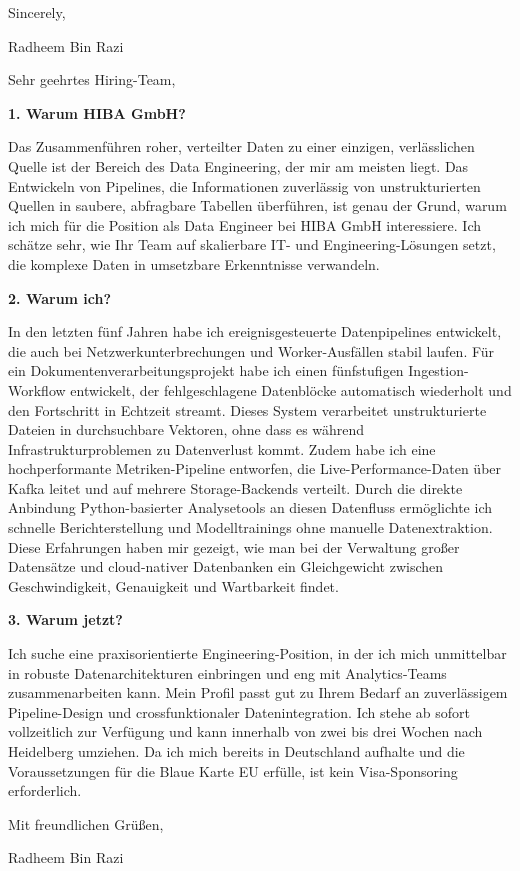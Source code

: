 \documentclass[11pt,a4paper]{coverletter}
\begin{document}
\closing{Sincerely,}{Radheem Bin Razi}

\clearpage
{}


\opening{Sehr geehrtes Hiring-Team,}

\vspace{8pt}\noindent\textbf{1. Warum HIBA GmbH?}\par\vspace{3pt}

Das Zusammenführen roher, verteilter Daten zu einer einzigen, verlässlichen Quelle ist der Bereich des Data Engineering, der mir am meisten liegt. Das Entwickeln von Pipelines, die Informationen zuverlässig von unstrukturierten Quellen in saubere, abfragbare Tabellen überführen, ist genau der Grund, warum ich mich für die Position als Data Engineer bei HIBA GmbH interessiere. Ich schätze sehr, wie Ihr Team auf skalierbare IT- und Engineering-Lösungen setzt, die komplexe Daten in umsetzbare Erkenntnisse verwandeln.

\vspace{8pt}\noindent\textbf{2. Warum ich?}\par\vspace{3pt}

In den letzten fünf Jahren habe ich ereignisgesteuerte Datenpipelines entwickelt, die auch bei Netzwerkunterbrechungen und Worker-Ausfällen stabil laufen. Für ein Dokumentenverarbeitungsprojekt habe ich einen fünfstufigen Ingestion-Workflow entwickelt, der fehlgeschlagene Datenblöcke automatisch wiederholt und den Fortschritt in Echtzeit streamt. Dieses System verarbeitet unstrukturierte Dateien in durchsuchbare Vektoren, ohne dass es während Infrastrukturproblemen zu Datenverlust kommt. Zudem habe ich eine hochperformante Metriken-Pipeline entworfen, die Live-Performance-Daten über Kafka leitet und auf mehrere Storage-Backends verteilt. Durch die direkte Anbindung Python-basierter Analysetools an diesen Datenfluss ermöglichte ich schnelle Berichterstellung und Modelltrainings ohne manuelle Datenextraktion. Diese Erfahrungen haben mir gezeigt, wie man bei der Verwaltung großer Datensätze und cloud-nativer Datenbanken ein Gleichgewicht zwischen Geschwindigkeit, Genauigkeit und Wartbarkeit findet.

\vspace{8pt}\noindent\textbf{3. Warum jetzt?}\par\vspace{3pt}

Ich suche eine praxisorientierte Engineering-Position, in der ich mich unmittelbar in robuste Datenarchitekturen einbringen und eng mit Analytics-Teams zusammenarbeiten kann. Mein Profil passt gut zu Ihrem Bedarf an zuverlässigem Pipeline-Design und crossfunktionaler Datenintegration. Ich stehe ab sofort vollzeitlich zur Verfügung und kann innerhalb von zwei bis drei Wochen nach Heidelberg umziehen. Da ich mich bereits in Deutschland aufhalte und die Voraussetzungen für die Blaue Karte EU erfülle, ist kein Visa-Sponsoring erforderlich.

\closing{Mit freundlichen Grüßen,}{Radheem Bin Razi}
\end{document}

